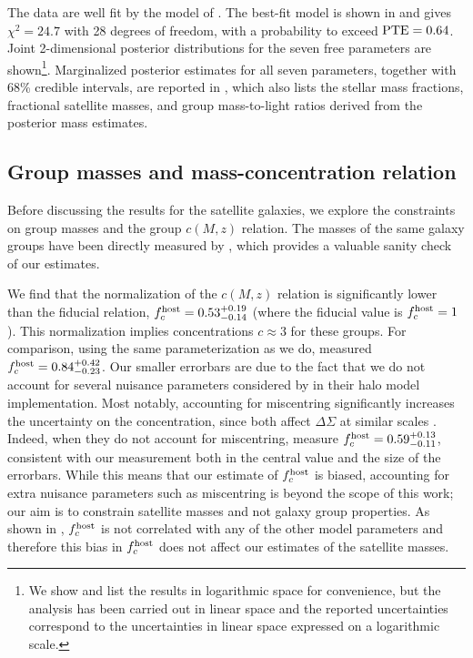 The data are well fit by the model of . The best-fit model is shown in 
 and gives $\chi^2=24.7$ with 28 degrees of freedom, with a probability to 
exceed ${\rm PTE}=0.64$. Joint 2-dimensional posterior distributions for the seven free parameters 
are shown\footnote{We show and list the results in logarithmic space for convenience, but the 
analysis has been carried out in linear space and the reported uncertainties correspond to the 
uncertainties in linear space expressed on a logarithmic scale.}. Marginalized 
posterior estimates for all seven parameters, together with 68\% credible intervals, are reported 
in , which also lists the stellar mass fractions, fractional satellite masses, and 
group mass-to-light ratios derived from the posterior mass estimates.

\subsection{Group masses and mass-concentration relation}\label{s:groupmasses}

Before discussing the results for the satellite galaxies, we explore the constraints on group 
masses and the group $c(M,z)$ relation. The masses of the same galaxy groups have been directly 
measured by \cite{viola15}, which provides a valuable sanity check of our estimates.

We find that the normalization of the $c(M,z)$ relation is significantly lower than the fiducial 
\cite{duffy08} relation, $f_c^{\rm host}=0.53_{-0.14}^{+0.19}$ (where the fiducial value is 
$f_c^{\rm host}=1$). This normalization implies concentrations $c\approx3$ for these groups. For 
comparison, using the same parameterization as we do, \cite{viola15} measured $f_c^{\rm 
host}=0.84_{-0.23}^{+0.42}$. Our smaller errorbars are due to the fact that we do not account for 
several nuisance parameters considered by \cite{viola15} in their halo model implementation. Most 
notably, accounting for miscentring significantly increases the uncertainty on the concentration, 
since both affect $\Delta\Sigma$ at similar scales \citep{viola15}. Indeed, when they do not account 
for miscentring, \cite{viola15} measure $f_c^{\rm host}=0.59_{-0.11}^{+0.13}$, consistent with our 
measurement both in the central value and the size of the errorbars. While this means that our 
estimate of $f_c^{\rm host}$ is biased, accounting for extra nuisance parameters such as miscentring 
is beyond the scope of this work; our aim is to constrain satellite masses and not galaxy group 
properties. As shown in , $f_c^{\rm host}$ is not correlated with any of the other 
model parameters and therefore this bias in $f_c^{\rm host}$ does not affect our estimates of the 
satellite masses. 

